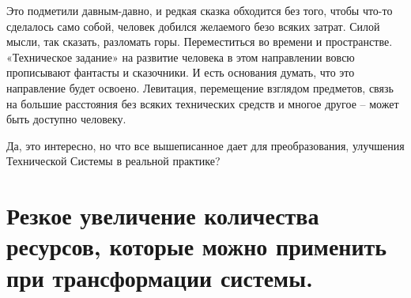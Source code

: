 \documentclass[11pt,a4paper]{article}
\begin{document}
Это подметили давным-давно, и редкая сказка обходится без того, чтобы что-то
сделалось само собой, человек добился желаемого безо всяких затрат. Силой
мысли, так сказать, разломать горы. Переместиться во времени и
пространстве. «Техническое задание» на развитие человека в этом направлении
вовсю прописывают фантасты и сказочники. И есть основания думать, что это
направление будет освоено. Левитация, перемещение взглядом предметов, связь на
большие расстояния без всяких технических средств и многое другое – может быть
доступно человеку.


Да, это интересно, но что все вышеписанное дает для преобразования, улучшения
Технической Системы в реальной практике?


\section*{Резкое увеличение количества ресурсов, которые можно применить при
трансформации системы.}
\end{document}
